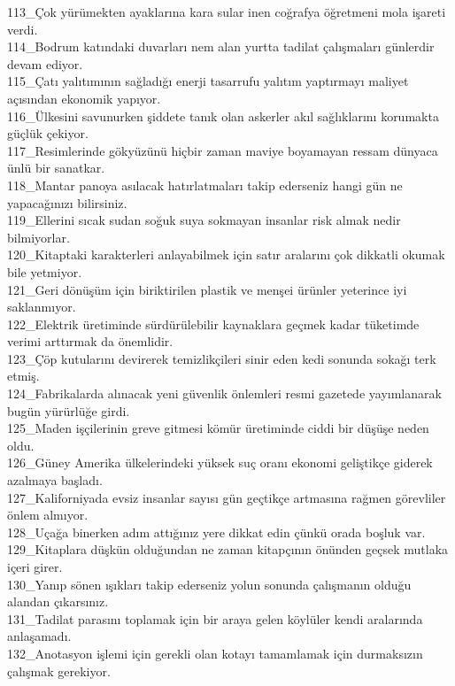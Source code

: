 \begin{myparindent}{0pt}
113\_Çok yürümekten ayaklarına kara sular inen coğrafya öğretmeni mola işareti verdi. \\
114\_Bodrum katındaki duvarları nem alan yurtta tadilat çalışmaları günlerdir devam ediyor. \\
115\_Çatı yalıtımının sağladığı enerji tasarrufu yalıtım yaptırmayı maliyet açısından ekonomik yapıyor. \\
116\_Ülkesini savunurken şiddete tanık olan askerler akıl sağlıklarını korumakta güçlük çekiyor. \\
117\_Resimlerinde gökyüzünü hiçbir zaman maviye boyamayan ressam dünyaca ünlü bir sanatkar. \\
118\_Mantar panoya asılacak hatırlatmaları takip ederseniz hangi gün ne yapacağınızı bilirsiniz. \\
119\_Ellerini sıcak sudan soğuk suya sokmayan insanlar risk almak nedir bilmiyorlar. \\
120\_Kitaptaki karakterleri anlayabilmek için satır aralarını çok dikkatli okumak bile yetmiyor. \\
121\_Geri dönüşüm için biriktirilen plastik ve menşei ürünler yeterince iyi saklanmıyor. \\
122\_Elektrik üretiminde sürdürülebilir kaynaklara geçmek kadar tüketimde verimi arttırmak da önemlidir. \\
123\_Çöp kutularını devirerek temizlikçileri sinir eden kedi sonunda sokağı terk etmiş. \\
124\_Fabrikalarda alınacak yeni güvenlik önlemleri resmi gazetede yayımlanarak bugün yürürlüğe girdi. \\
125\_Maden işçilerinin greve gitmesi kömür üretiminde ciddi bir düşüşe neden oldu. \\
126\_Güney Amerika ülkelerindeki yüksek suç oranı ekonomi geliştikçe giderek azalmaya başladı. \\
127\_Kaliforniyada evsiz insanlar sayısı gün geçtikçe artmasına rağmen görevliler önlem almıyor. \\
128\_Uçağa binerken adım attığınız yere dikkat edin çünkü orada boşluk var. \\
129\_Kitaplara düşkün olduğundan ne zaman kitapçının önünden geçsek mutlaka içeri girer. \\
130\_Yanıp sönen ışıkları takip ederseniz yolun sonunda çalışmanın olduğu alandan çıkarsınız. \\
131\_Tadilat parasını toplamak için bir araya gelen köylüler kendi aralarında anlaşamadı. \\
132\_Anotasyon işlemi için gerekli olan kotayı tamamlamak için durmaksızın çalışmak gerekiyor. \\

\end{myparindent}

